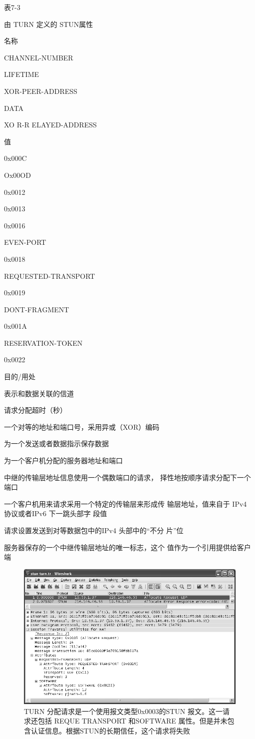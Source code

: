 表7-3

由 TURN 定义的 STUN属性

名称

CHANNEL-NUMBER

LIFETIME

XOR-PEER-ADDRESS

DATA

XO R-R ELAYED-ADDRESS

值

0x000C

Ox00OD

0x0012

0x0013

0x0016

EVEN-PORT

0x0018

REQUESTED-TRANSPORT

0x0019

DONT-FRAGMENT

0x001A

RESERVATION-TOKEN

0x0022

目的/用处

表示和数据关联的信道

请求分配超时（秒）

一个对等的地址和端口号，采用异或（XOR）编码

为一个发送或者数据指示保存数据

为一个客户机分配的服务器地址和端口

中继的传输层地址信息使用一个偶数端口的请求，
择性地按顺序请求分配下一个端口

一个客户机用来请求采用一个特定的传输层来形成传
输层地址，值来自于 IPv4 协议或者IPv6 下一跳头部字
段值

请求设置发送到对等数据包中的IPv4 头部中的“不分
片”位

服务器保存的一个中继传输层地址的唯一标志，这个
值作为一个引用提供给客户端

\begin{figure}[H]
    \centering
	\includegraphics[scale=0.5]{imgs/7/7-12.png}
	\caption{TURN 分配请求是一个使用报文类型0x0003的STUN 报文。这一请求还包括 REQUE TRANSPORT 和SOFTWARE 属性。但是并未包含认证信息。根据STUN的长期信任，这个请求将失败}
\end{figure}

